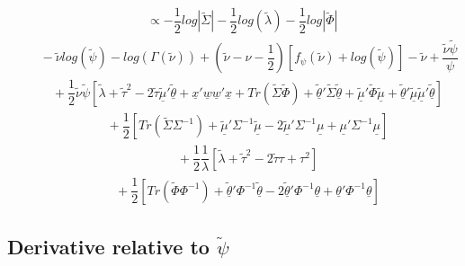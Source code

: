 \documentclass[fleqn]{minimal}
\begin{document}
\begin{align*}
  \ \ \ \ \ \
  \propto
  -\dfrac{1}{2}
  log \left| \tilde{\Sigma} \right|
  -\dfrac{1}{2}
  log \left(
    \tilde{\lambda}
  \right)
  - \dfrac{1}{2}
  log \left| \tilde{\Phi} \right|
\end{align*}
\begin{align*}
  \ \ \ \ \ \ \ \ \ \
  -
  \tilde{\nu}
  log \left(
    \tilde{\psi}
  \right)
  -
  log \left(
    \Gamma(\tilde{\nu})
  \right)
  +
  \left(
    \tilde{\nu}
    -\nu
    -\dfrac{1}{2}
  \right)
  \left[
    f_{\psi} \left( \tilde{\nu} \right)
    + log\left( \tilde{\psi} \right)
  \right]
  - 
  \tilde{\nu}
  + 
  \dfrac{\tilde{\nu} \tilde{\psi}}{\psi}
\end{align*}
\begin{align*}
  \ \ \ \ \ \ \ \ \ \
  + \dfrac{1}{2}
  \tilde{\nu} \tilde{\psi}
  \left[
    \tilde{\lambda} + \tilde{\tau}^2
    - 2\tilde{\tau}\underline{\tilde{\mu}}'\underline{\tilde{\theta}}
    + \underline{x}'\underline{w}\underline{w}'\underline{x}
    + Tr \left( \tilde{\Sigma}\tilde{\Phi}\right)
    + \underline{\tilde{\theta}}'\tilde{\Sigma}\underline{\tilde{\theta}}
    + \underline{\tilde{\mu}}'\tilde{\Phi}\underline{\tilde{\mu}}
    + \underline{\tilde{\theta}}'\underline{\tilde{\mu}}\underline{\tilde{\mu}}'\underline{\tilde{\theta}}
  \right]
\end{align*}
\begin{align*}
  \ \ \ \ \ \ \ \ \ \
  +\dfrac{1}{2}
  \left[
    Tr \left( \tilde{\Sigma}\Sigma^{-1}\right)
    + \underline{\tilde{\mu}}'\Sigma^{-1}\underline{\tilde{\mu}}
    -2 \underline{\tilde{\mu}}'\Sigma^{-1}\underline{\mu}
    + \underline{\mu}'\Sigma^{-1}\underline{\mu}
  \right]
\end{align*}
\begin{align*}
  \ \ \ \ \ \ \ \ \ \
  +\dfrac{1}{2}
  \dfrac{1}{\lambda}
  \left[
    \tilde{\lambda} + \tilde{\tau}^2 - 2\tilde{\tau}\tau + \tau^2
  \right]
\end{align*}
\begin{align*}
  \ \ \ \ \ \ \ \ \ \
  + \dfrac{1}{2}
  \left[
    Tr\left(\tilde{\Phi} \Phi^{-1}\right)
    + \underline{\tilde{\theta}}'\Phi^{-1}\underline{\tilde{\theta}}
    -2 \underline{\tilde{\theta}}' \Phi^{-1}\underline{\theta}
    + \underline{\theta}' \Phi^{-1}\underline{\theta}
  \right]
\end{align*}


\subsection{Derivative relative to $\tilde{\psi}$}
\end{document}
